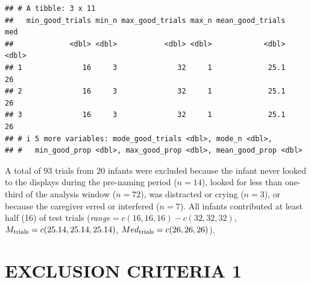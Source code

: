 \documentclass[
  doc,floatsintext]{apa6}
\newenvironment{Shaded}{\begin{snugshade}}{\end{snugshade}}
\newcommand{\FunctionTok}[1]{\textcolor[rgb]{0.13,0.29,0.53}{\textbf{#1}}}
\newcommand{\NormalTok}[1]{#1}
\newcommand{\OtherTok}[1]{\textcolor[rgb]{0.56,0.35,0.01}{#1}}
\newcommand{\SpecialCharTok}[1]{\textcolor[rgb]{0.81,0.36,0.00}{\textbf{#1}}}
\newcommand{\StringTok}[1]{\textcolor[rgb]{0.31,0.60,0.02}{#1}}
\begin{document}
\begin{verbatim}
## # A tibble: 3 x 11
##   min_good_trials min_n max_good_trials max_n mean_good_trials   med
##             <dbl> <dbl>           <dbl> <dbl>            <dbl> <dbl>
## 1              16     3              32     1             25.1    26
## 2              16     3              32     1             25.1    26
## 3              16     3              32     1             25.1    26
## # i 5 more variables: mode_good_trials <dbl>, mode_n <dbl>,
## #   min_good_prop <dbl>, max_good_prop <dbl>, mean_good_prop <dbl>
\end{verbatim}

A total of \(93\) trials from 20 infants were excluded because the infant never looked to the displays during the pre-naming period (\(n=14\)), looked for less than one-third of the analysis window (\(n=72\)), was distracted or crying (\(n=3\)), or because the caregiver erred or interfered (\(n=7\)). All infants contributed at least half (16) of test trials (\textit{range}\(=c(16, 16, 16)-c(32, 32, 32)\), \(M_\textnormal{trials}=c(25.14, 25.14, 25.14)\), \(Med_\textnormal{trials}=c(26, 26, 26)\)).

\section{EXCLUSION CRITERIA 1}\label{exclusion-criteria-1}

\begin{Shaded}
\end{Shaded}
\end{document}
